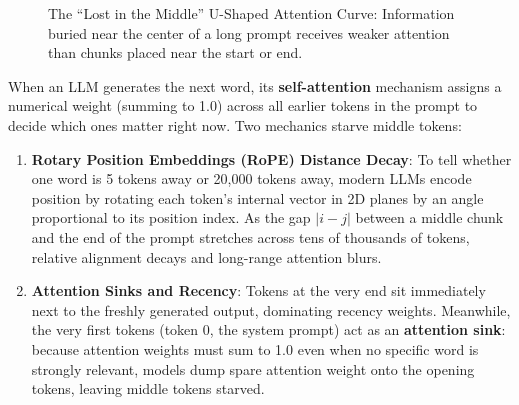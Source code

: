 \begin{figure}[htbp]
\centering
{}
\caption{The ``Lost in the Middle'' U-Shaped Attention Curve: Information buried near the center of a long prompt receives weaker attention than chunks placed near the start or end.}
\label{fig:v2-ch02-lost-middle}
\end{figure}

\begin{underthehoodbox}
When an LLM generates the next word, its \textbf{self-attention} mechanism assigns a numerical weight (summing to 1.0) across all earlier tokens in the prompt to decide which ones matter right now. Two mechanics starve middle tokens:
\begin{enumerate}
  \item \textbf{Rotary Position Embeddings (RoPE) Distance Decay}: To tell whether one word is 5 tokens away or 20,000 tokens away, modern LLMs encode position by rotating each token's internal vector in 2D planes by an angle proportional to its position index. As the gap $|i - j|$ between a middle chunk and the end of the prompt stretches across tens of thousands of tokens, relative alignment decays and long-range attention blurs.
  \item \textbf{Attention Sinks and Recency}: Tokens at the very end sit immediately next to the freshly generated output, dominating recency weights. Meanwhile, the very first tokens (token 0, the system prompt) act as an \textbf{attention sink}: because attention weights must sum to 1.0 even when no specific word is strongly relevant, models dump spare attention weight onto the opening tokens, leaving middle tokens starved.
\end{enumerate}
\end{underthehoodbox}

